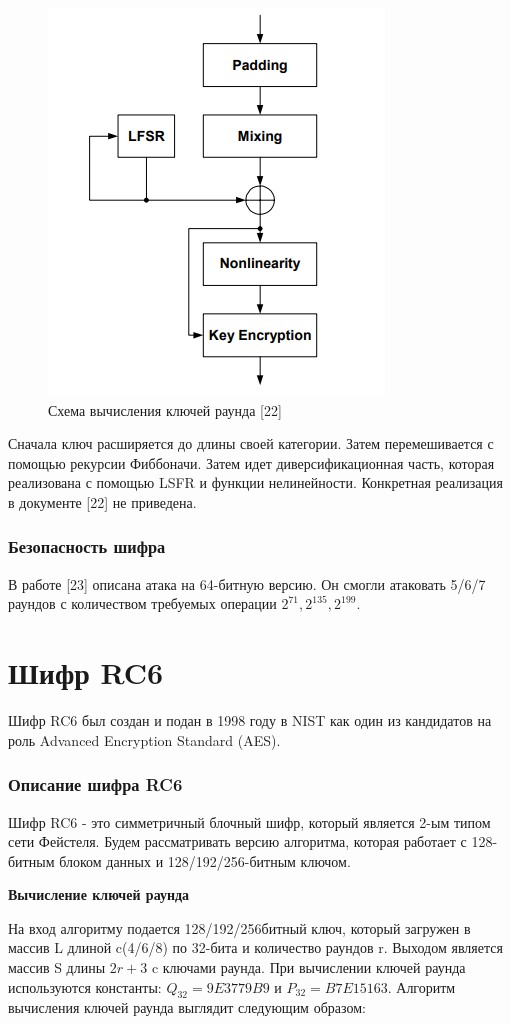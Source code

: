 \documentclass[colorthm]{./civarticle}
\begin{document}
\begin{figure}[H]
    \centering
    \includegraphics[width=0.25\linewidth]{foto.png}
    \caption{Схема вычисления ключей раунда [22]}
    \label{fig:enter-label}
\end{figure}

Сначала ключ расширяется до длины своей категории. Затем перемешивается с помощью рекурсии Фиббоначи. Затем идет диверсификационная часть, которая реализована с помощью LSFR и функции нелинейности. Конкретная реализация в документе [22] не приведена.

\subsubsection{Безопасность шифра}
В работе [23] описана атака на 64-битную версию. Он смогли атаковать 5/6/7 раундов с количеством требуемых операции $2^{71}, 2^{135}, 2^{199}$.


\section{Шифр RC6}
Шифр RC6 был создан и подан в 1998 году в NIST как один из кандидатов на роль Advanced Encryption Standard (AES).

\subsubsection{Описание шифра RC6}

Шифр RC6 - это симметричный блочный шифр, который является 2-ым типом сети Фейстеля. Будем рассматривать версию алгоритма, которая работает с 128-битным блоком данных и 128/192/256-битным ключом.

\textbf{Вычисление ключей раунда}

На вход алгоритму подается 128/192/256битный ключ, который загружен в массив L длиной c(4/6/8) по 32-бита и количество раундов r. Выходом является массив S длины $2r+3$ c ключами раунда. При вычислении ключей раунда используются константы: $Q_{32} = 9E3779B9$ и $P_{32} = B7E15163$. Алгоритм вычисления ключей раунда выглядит следующим образом:
\end{document}
